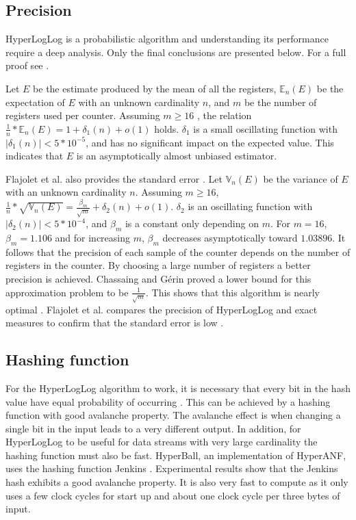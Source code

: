 \subsection{Precision}
HyperLogLog is a probabilistic algorithm and understanding its performance require a deep analysis. Only the final conclusions are presented below. For a full proof see \cite{hyperloglog}. 

Let $E$ be the estimate produced by the mean of all the registers, $\mathbb{E}_n(E)$ be the expectation of $E$ with an unknown cardinality $n$, and $m$ be the number of registers used per counter. Assuming $m \geq 16$ , the relation $\frac{1}{n}*\mathbb{E}_n(E) = 1 + \delta_1(n) + o(1)$ holds. $\delta_1$ is a small oscillating function with $|\delta_1(n)| < 5*10^{-5}$, and has no significant impact on the expected value. This indicates that $E$ is an asymptotically almost unbiased estimator.

Flajolet et al. also provides the standard error \cite{hyperloglog}. Let $\mathbb{V}_n(E)$ be the variance of $E$ with an unknown cardinality $n$. Assuming $m \geq 16$,  $\frac{1}{n}*\sqrt{\mathbb{V}_n(E)} = \frac{\beta_m}{\sqrt{m}}  + \delta_2(n) + o(1)$. $\delta_2$ is an oscillating function with $|\delta_2(n)| < 5*10^{-4}$, and $\beta_m$ is a constant only depending on $m$. For $m = 16$, $\beta_m = 1.106$ and for increasing $m$, $\beta_m$ decreases asymptotically toward $1.03896$. It follows that the precision of each sample of the counter depends on the number of registers in the counter. By choosing a large number of registers a better precision is achieved. Chassaing and Gérin proved a lower bound for this approximation problem to be $\frac{1}{\sqrt{m}}$. This shows that this algorithm is nearly optimal \cite{nearopt}. Flajolet et al. compares the precision of HyperLogLog and exact measures to confirm that the standard error is low \cite{hyperloglog}.

\subsection{Hashing function}
For the HyperLogLog algorithm to work, it is necessary that every bit in the hash value have equal probability of occurring \cite{hyperloglog}. This can be achieved by a hashing function with good avalanche property. The avalanche effect is when changing a single bit in the input leads to a very different output. In addition, for HyperLogLog to be useful for data streams with very large cardinality the hashing function must also be fast. HyperBall, an implementation of HyperANF, uses the hashing function Jenkins \cite{webgraph}. Experimental results show that the Jenkins hash exhibits a good avalanche property. It is also very fast to compute as it only uses a few clock cycles for start up and about one clock cycle per three bytes of input.

